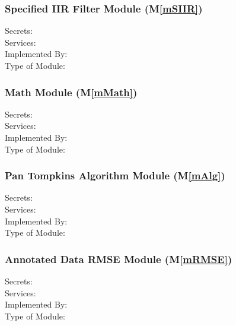 \documentclass[12pt, titlepage]{article}
\newcommand{\mref}[1]{M\ref{#1}}
\begin{document}
\subsubsection{Specified IIR Filter Module (\mref{mSIIR})}

\begin{description}
\item[Secrets:]
\item[Services:]
\item[Implemented By:] \progname
\item[Type of Module:]
\end{description}

\subsubsection{Math Module (\mref{mMath})}

\begin{description}
\item[Secrets:]
\item[Services:]
\item[Implemented By:] \progname
\item[Type of Module:]
\end{description}

\subsubsection{Pan Tompkins Algorithm Module (\mref{mAlg})}

\begin{description}
\item[Secrets:]
\item[Services:]
\item[Implemented By:] \progname
\item[Type of Module:]
\end{description}

\subsubsection{Annotated Data RMSE Module (\mref{mRMSE})}

\begin{description}
\item[Secrets:]
\item[Services:]
\item[Implemented By:] \progname
\item[Type of Module:]
\end{description}
\end{document}
